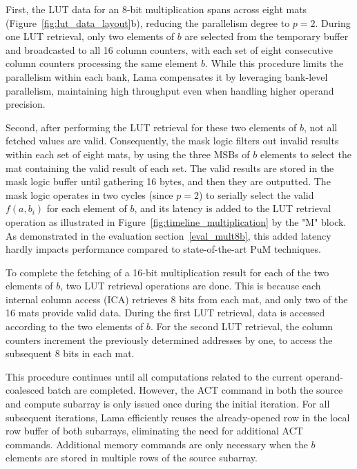 First, the LUT data for an 8-bit multiplication spans across eight mats (Figure~\ref{fig:lut_data_layout}b), reducing the parallelism degree to $p=2$. During one LUT retrieval, only two elements of $b$ are selected from the temporary buffer and broadcasted to all 16 column counters, with each set of eight consecutive column counters processing the same element $b$. While this procedure limits the parallelism within each bank, Lama compensates it by leveraging bank-level parallelism, maintaining high throughput even when handling higher operand precision.


Second, after performing the LUT retrieval for these two elements of $b$, not all fetched values are valid. Consequently, the mask logic filters out invalid results within each set of eight mats, by using the three MSBs of $b$ elements to select the mat containing the valid result of each set. The valid results are stored in the mask logic buffer until gathering 16 bytes, and then they are outputted. The mask logic operates in two cycles (since $p=2$) to serially select the valid $f(a,b_{i})$ for each element of $b$, and its latency is added to the LUT retrieval operation as illustrated in Figure~\ref{fig:timeline_multiplication} by the "M" block. As demonstrated in the evaluation section~\ref{eval_mult8b}, this added latency hardly impacts performance compared to state-of-the-art PuM techniques.

To complete the fetching of a 16-bit multiplication result for each of the two elements of $b$, two LUT retrieval operations are done. This is because each internal column access (ICA) retrieves 8 bits from each mat, and only two of the 16 mats provide valid data. During the first LUT retrieval, data is accessed according to the two elements of $b$. For the second LUT retrieval, the column counters increment the previously determined addresses by one, to access the subsequent 8 bits in each mat.

This procedure continues until all computations related to the current operand-coalesced batch are completed. However, the ACT command in both the source and compute subarray is only issued once during the initial iteration. For all subsequent iterations, Lama efficiently reuses the already-opened row in the local row buffer of both subarrays, eliminating the need for additional ACT commands. Additional memory commands are only necessary when the $b$ elements are stored in multiple rows of the source subarray.

